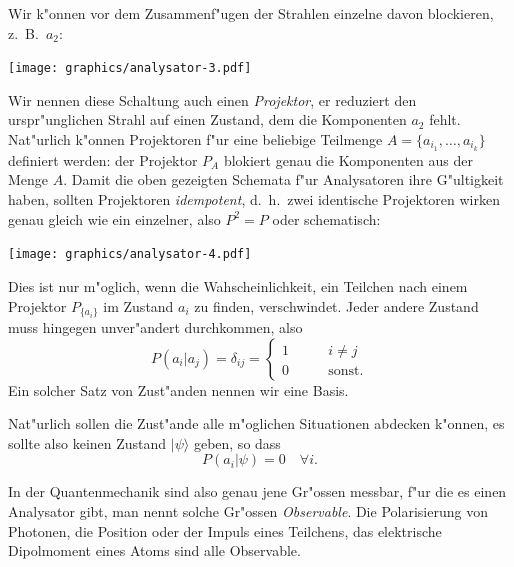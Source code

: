 Wir k"onnen vor dem Zusammenf"ugen der Strahlen einzelne davon
blockieren, z.~B.~$a_2$:
\begin{center}
\texttt{[image: graphics/analysator-3.pdf]}
\end{center}
Wir nennen diese Schaltung auch einen {\em Projektor}, er reduziert den
urspr"unglichen Strahl auf einen Zustand, dem die Komponenten $a_2$
fehlt. Nat"urlich k"onnen Projektoren f"ur eine beliebige Teilmenge
$A=\{a_{i_1},\dots, a_{i_k}\}$ definiert werden: der Projektor $P_A$
blokiert genau die Komponenten aus der Menge $A$.
Damit die oben gezeigten Schemata f"ur Analysatoren ihre G"ultigkeit
haben, sollten Projektoren {\em idempotent}, d.~h.~zwei identische 
Projektoren wirken genau gleich wie ein einzelner, also $P^2=P$ oder
schematisch:
\begin{center}
\texttt{[image: graphics/analysator-4.pdf]}
\end{center}

Dies ist nur m"oglich, wenn die Wahscheinlichkeit, ein Teilchen nach
einem Projektor $P_{\{a_i\}}$ im Zustand $a_i$ zu finden, verschwindet.
Jeder andere Zustand muss hingegen unver"andert durchkommen, also
\[
P(a_i|a_j)=\delta_{ij}=\begin{cases}
1&\qquad i\ne j\\
0&\qquad\text{sonst.}
\end{cases}
\]
Ein solcher Satz von Zust"anden nennen wir eine Basis.

Nat"urlich sollen die Zust"ande alle m"oglichen Situationen abdecken
k"onnen, es sollte also keinen Zustand $|\psi\rangle$ geben, so dass
\[
P(a_i|\psi)=0\quad\forall i.
\]

In der Quantenmechanik sind also genau jene Gr"ossen messbar, f"ur die
es einen Analysator gibt, man nennt solche Gr"ossen {\em Observable}.
Die Polarisierung von Photonen, die Position oder der Impuls
eines Teilchens, das elektrische Dipolmoment eines Atoms sind alle
Observable.

